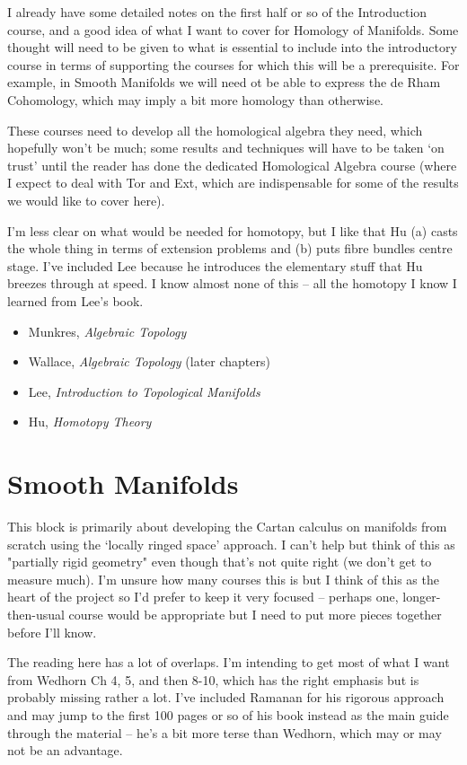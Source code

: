 \documentclass[article]{article}
\begin{document}
I already have some detailed notes on the first half or so of the Introduction course, and a good idea of what I want to cover for Homology of Manifolds. Some thought will need to be given to what is essential to include into the introductory course in terms of supporting the courses for which this will be a prerequisite. For example, in Smooth Manifolds we will need ot be able to express the de Rham Cohomology, which may imply a bit more homology than otherwise.

These courses need to develop all the homological algebra they need, which hopefully won't be much; some results and techniques will have to be taken `on trust' until the reader has done the dedicated Homological Algebra course (where I expect to deal with Tor and Ext, which are indispensable for some of the results we would like to cover here).

I'm less clear on what would be needed for homotopy, but I like that Hu (a) casts the whole thing in terms of extension problems and (b) puts fibre bundles centre stage. I've included Lee because he introduces the elementary stuff that Hu breezes through at speed. I know almost none of this -- all the homotopy I know I learned from Lee's book.

\begin{itemize}
	\item[]{Munkres, \textit{Algebraic Topology}}
	\item[]{Wallace, \textit{Algebraic Topology} (later chapters)}
	\item[]{Lee, \textit{Introduction to Topological Manifolds}}
	\item[]{Hu, \textit{Homotopy Theory}}
\end{itemize}

\section{Smooth Manifolds}

This block is primarily about developing the Cartan calculus on manifolds from scratch using the `locally ringed space' approach. I can't help but think of this as "partially rigid geometry" even though that's not quite right (we don't get to measure much). I'm unsure how many courses this is but I think of this as the heart of the project so I'd prefer to keep it very focused -- perhaps one, longer-then-usual course would be appropriate but I need to put more pieces together before I'll know.

The reading here has a lot of overlaps. I'm intending to get most of what I want from Wedhorn Ch 4, 5, and then 8-10, which has the right emphasis but is probably missing rather a lot. I've included Ramanan for his rigorous approach and may jump to the first 100 pages or so of his book instead as the main guide through the material -- he's a bit more terse than Wedhorn, which may or may not be an advantage.
\end{document}
